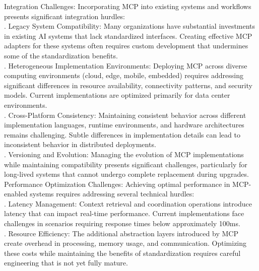 Integration Challenges: Incorporating MCP into existing systems and workflows presents significant integration hurdles:\\ . Legacy System Compatibility: Many organizations have substantial investments in existing AI systems that lack standardized interfaces. Creating effective MCP adapters for these systems often requires custom development that undermines some of the standardization benefits.\\ . Heterogeneous Implementation Environments: Deploying MCP across diverse computing environments (cloud, edge, mobile, embedded) requires addressing significant differences in resource availability, connectivity patterns, and security models. Current implementations are optimized primarily for data center environments.\\ . Cross-Platform Consistency: Maintaining consistent behavior across different implementation languages, runtime environments, and hardware architectures remains challenging. Subtle differences in implementation details can lead to inconsistent behavior in distributed deployments.\\ . Versioning and Evolution: Managing the evolution of MCP implementations while maintaining compatibility presents significant challenges, particularly for long-lived systems that cannot undergo complete replacement during upgrades.\\ \newline
Performance Optimization Challenges: Achieving optimal performance in MCP-enabled systems requires addressing several technical hurdles:\\ . Latency Management: Context retrieval and coordination operations introduce latency that can impact real-time performance. Current implementations face challenges in scenarios requiring response times below approximately 100ms.\\ . Resource Efficiency: The additional abstraction layers introduced by MCP create overhead in processing, memory usage, and communication. Optimizing these costs while maintaining the benefits of standardization requires careful engineering that is not yet fully mature.\\ \newline
